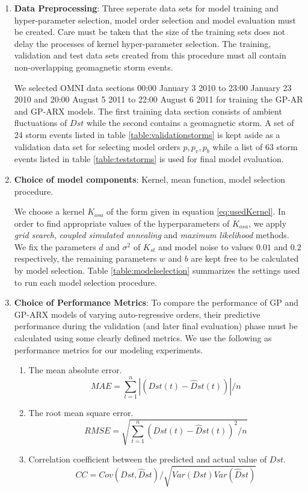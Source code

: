 \documentclass{article}
\begin{document}
\begin{enumerate}

\item \textbf{Data Preprocessing}: Three seperate data sets for model training and hyper-parameter selection, model order selection and model evaluation must be created. Care must be taken that the size of the training sets does not delay the processes of kernel hyper-parameter selection. The training, validation and test data sets created from this procedure must all contain non-overlapping geomagnetic storm events. 

  We selected OMNI data sections 00:00 January 3 2010 to 23:00 January 23 2010 and 20:00 August 5 2011 to 22:00 August 6 2011 for training the GP-AR and GP-ARX models. The first training data section consists of ambient fluctuations of $Dst$ while the second contains a geomagnetic storm. A set of 24 storm events listed in table \ref{table:validationstorms} is kept aside as a validation data set for selecting model orders $p, p_v, p_b$ while a list of 63 storm events listed in table \ref{table:teststorms} is used for final model evaluation.


\item \textbf{Choice of model components}:  Kernel, mean function, model selection procedure. 

  We choose a kernel $K_{osa}$ of the form given in equation \ref{eq:usedKernel}. In order to find appropriate values of the hyperparameters of $K_{osa}$, we apply \emph{grid search}, \emph{coupled simulated annealing} and \emph{maximum likelihood} methods. We fix the parameters $d$ and $\sigma^2$ of $K_{st}$ and model noise to values $0.01$ and $0.2$ respectively, the remaining parameters $w$ and $b$ are kept free to be calculated by model selection. Table \ref{table:modelselection} summarizes the settings used to run each model selection procedure.

\item \textbf{Choice of Performance Metrics}: To compare the performance of GP and GP-ARX models of varying auto-regressive orders, their predictive performance during the validation (and later final evaluation) phase must be calculated using some clearly defined metrics. We use the following as performance metrics for our modeling experiments.

  \begin{enumerate}
  \item The mean absolute error.
    \begin{equation}
      MAE = \sum_{t=1}^{n} \left |(Dst(t) - \hat{D}st(t)) \right | / n
    \end{equation}
  \item The root mean square error.
    \begin{equation}
      RMSE = \sqrt{\sum_{t=1}^{n} (Dst(t) - \hat{D}st(t))^2 / n}
    \end{equation}
  \item Correlation coefficient between the predicted and actual value of $Dst$.
    \begin{equation}
      CC = Cov(Dst, \hat{D}st)/\sqrt{Var(Dst) Var(\hat{D}st)}
    \end{equation}
  \end{enumerate}



\end{enumerate}
\end{document}

